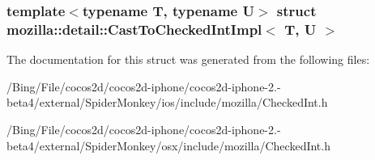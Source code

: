 \subsubsection*{template$<$typename T, typename U$>$ struct mozilla\-::detail\-::\-Cast\-To\-Checked\-Int\-Impl$<$ T, U $>$}



The documentation for this struct was generated from the following files\-:\begin{DoxyCompactItemize}
\item 
/\-Bing/\-File/cocos2d/cocos2d-\/iphone/cocos2d-\/iphone-\/2.-\/beta4/external/\-Spider\-Monkey/ios/include/mozilla/Checked\-Int.\-h\item 
/\-Bing/\-File/cocos2d/cocos2d-\/iphone/cocos2d-\/iphone-\/2.-\/beta4/external/\-Spider\-Monkey/osx/include/mozilla/Checked\-Int.\-h\end{DoxyCompactItemize}
